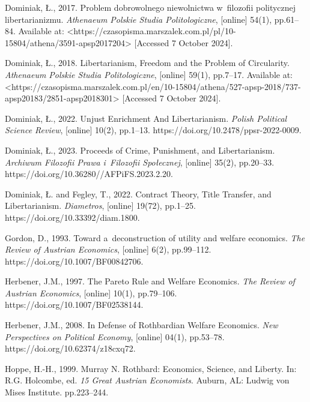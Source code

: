Dominiak, Ł., 2017. Problem dobrowolnego niewolnictwa w~filozofii politycznej libertarianizmu. \textit{Athenaeum Polskie Studia Politologiczne}, [online] 54(1), pp.61–84. Available at: {\textless}https://czasopisma.marszalek.com.pl/pl/10-15804/athena/3591-apsp2017204{\textgreater} [Accessed 7 October 2024].



Dominiak, Ł., 2018. Libertarianism, Freedom and the Problem of Circularity. \textit{Athenaeum Polskie Studia Politologiczne}, [online] 59(1), pp.7–17. Available at: {\textless}https://czasopisma.marszalek.com.pl/en/10-15804/athena/527-apsp-2018/737-apsp20183/2851-apsp2018301{\textgreater} [Accessed 7 October 2024].



Dominiak, Ł., 2022. Unjust Enrichment And Libertarianism. \textit{Polish Political Science Review}, [online] 10(2), pp.1–13. https://doi.org/10.2478/ppsr-2022-0009.



Dominiak, Ł., 2023. Proceeds of Crime, Punishment, and Libertarianism. \textit{Archiwum Filozofii Prawa i~Filozofii Społecznej}, [online] 35(2), pp.20–33. https://doi.org/10.36280//AFPiFS.2023.2.20.



Dominiak, Ł. and Fegley, T., 2022. Contract Theory, Title Transfer, and Libertarianism. \textit{Diametros}, [online] 19(72), pp.1–25. https://doi.org/10.33392/diam.1800.



Gordon, D., 1993. Toward a~deconstruction of utility and welfare economics. \textit{The Review of Austrian Economics}, [online] 6(2), pp.99–112. https://doi.org/10.1007/BF00842706.



Herbener, J.M., 1997. The Pareto Rule and Welfare Economics. \textit{The Review of Austrian Economics}, [online] 10(1), pp.79–106. https://doi.org/10.1007/BF02538144.



Herbener, J.M., 2008. In Defense of Rothbardian Welfare Economics. \textit{New Perspectives on Political Economy}, [online] 04(1), pp.53–78. https://doi.org/10.62374/z18cxq72.



Hoppe, H.-H., 1999. Murray N. Rothbard: Economics, Science, and Liberty. In: R.G. Holcombe, ed. \textit{15 Great Austrian Economists}. Auburn, AL: Ludwig von Mises Institute. pp.223–244.



